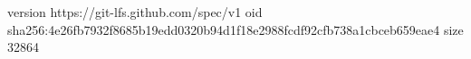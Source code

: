 version https://git-lfs.github.com/spec/v1
oid sha256:4e26fb7932f8685b19edd0320b94d1f18e2988fcdf92cfb738a1cbceb659eae4
size 32864
